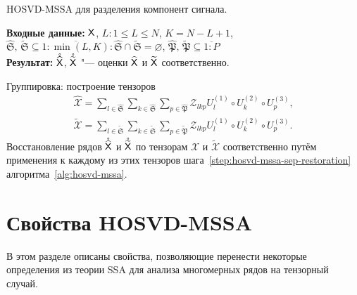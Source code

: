 \documentclass[specialist,
    substylefile = spbu.rtx,
    subf,href,colorlinks=true, 12pt]{disser}
\theoremstyle{plain}
\theoremstyle{definition}
\theoremstyle{remark}
\newcommand{\Input}{\textbf{Входные данные: }}
\newcommand{\Output}{\textbf{Результат: }}
\begin{document}
    \begin{algorithm}[!ht]
        \caption{HOSVD-MSSA для разделения компонент сигнала.}
        \label{alg:hosvd-mssa-sep}
        \Input $\mathsf{X}$,
        $L: 1\leqslant L \leqslant N$, $K = N - L + 1$, 
        $\widehat{\mathfrak{S}},\, \widetilde{\mathfrak{S}} \subseteq \overline{1:\min(L, K)}: 
        \widehat{\mathfrak{S}} \cap \widetilde{\mathfrak{S}} = \varnothing$,
        $\widehat{\mathfrak{P}},\, \widetilde{\mathfrak{P}}  \subseteq \overline{1:P}$\\
        \Output $\mathring{\widehat{\mathsf{X}}}$, $\mathring{\widetilde{\mathsf{X}}}$ "--- оценки $\widehat{\mathsf{X}}$ и $\widetilde{\mathsf{X}}$
        соответственно.
        \begin{algorithmic}[1]
            \setcounter{ALG@line}{2}
            \State Группировка: построение тензоров
            \begin{gather*}
                \widehat{\mathcal{X}}=\sum_{l \in \widehat{\mathfrak{S}}} \sum_{k\in \widehat{\mathfrak{S}}}
                \sum_{p\in \widehat{\mathfrak{P}}}
                \mathcal{Z}_{lkp} U^{(1)}_{l}\circ U^{(2)}_{k} \circ U^{(3)}_{p},\\
                \widetilde{\mathcal{X}}=\sum_{l \in \widetilde{\mathfrak{S}}} \sum_{k\in \widetilde{\mathfrak{S}}}
                \sum_{p\in \widetilde{\mathfrak{P}}}
                \mathcal{Z}_{lkp} U^{(1)}_{l}\circ U^{(2)}_{k} \circ U^{(3)}_{p}.
            \end{gather*}
            \State Восстановление рядов $\mathring{\widehat{\mathsf{X}}}$ и $\mathring{\widetilde{\mathsf{X}}}$ по тензорам $\widehat{\mathcal{X}}$ и $\widetilde{\mathcal{X}}$ соответственно путём применения к 
            каждому из этих тензоров шага~\ref{step:hosvd-mssa-sep-restoration} алгоритма~\ref{alg:hosvd-mssa}.
        \end{algorithmic}
    \end{algorithm}
    

    \section{Свойства HOSVD-MSSA}\label{sec:hosvd-mssa-properties}
    В этом разделе описаны свойства, позволяющие перенести некоторые определения из теории SSA для анализа многомерных
    рядов на тензорный случай.
    
\end{document}
